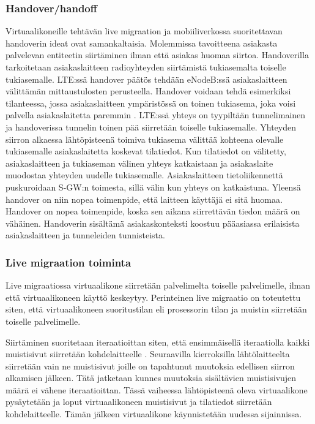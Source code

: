 \subsubsection*{Handover/handoff}%
Virtuaalikoneille tehtävän live migraation ja mobiiliverkossa suoritettavan handoverin ideat ovat samankaltaisia. Molemmissa tavoitteena asiakasta palvelevan entiteetin siirtäminen ilman että asiakas huomaa siirtoa.
Handoverilla tarkoitetaan asiakaslaitteen radioyhteyden siirtämistä tukiasemalta toiselle tukiasemalle. 
LTE:ssä handover päätös tehdään eNodeB:ssä asiakaslaitteen välittämän mittaustulosten perusteella. 
Handover voidaan tehdä esimerkiksi tilanteessa, jossa asiakaslaitteen ympäristössä on toinen tukiasema, joka voisi palvella asiakaslaitetta paremmin \cite[s.~96]{etsilte}.
LTE:ssä yhteys on tyypiltään tunnelimainen ja handoverissa tunnelin toinen pää siirretään toiselle tukiasemalle.
Yhteyden siirron alkaessa lähtöpisteenä toimiva tukiasema välittää kohteena olevalle tukiasemalle asiakaslaitetta koskevat tilatiedot. Kun tilatiedot on välitetty, asiakaslaitteen ja tukiaseman välinen yhteys katkaistaan ja asiakaslaite muodostaa yhteyden uudelle tukiasemalle.
Asiakaslaitteen tietoliikennettä puskuroidaan S-GW:n toimesta, sillä välin kun yhteys on katkaistuna. Yleensä handover on niin nopea toimenpide, että laitteen käyttäjä ei sitä huomaa.
Handover on nopea toimenpide, koska sen aikana siirrettävän tiedon määrä on vähäinen.
Handoverin sisältämä asiakaskonteksti koostuu pääasiassa erilaisista asiakaslaitteen ja tunneleiden tunnisteista.

\subsubsection*{Live migraation toiminta}%
Live migraatiossa virtuaalikone siirretään palvelimelta toiselle palvelimelle, ilman että virtuaalikoneen käyttö keskeytyy. 
Perinteinen live migraatio on toteutettu siten, että virtuaalikoneen suoritustilan eli prosessorin tilan ja muistin siirretään toiselle palvelimelle.

Siirtäminen suoritetaan iteraatioittan siten, että ensimmäisellä iteraatiolla kaikki muistisivut siirretään kohdelaitteelle \cite{clark2005live}.
Seuraavilla kierroksilla lähtölaitteelta siirretään vain ne muistisivut joille on tapahtunut muutoksia edellisen siirron alkamisen jälkeen. 
Tätä jatketaan kunnes muutoksia sisältävien muistisivujen määrä ei vähene iteraatioittan.
Tässä vaiheessa lähtöpisteenä oleva virtuaalikone pysäytetään ja loput virtuaalikoneen muistisivut ja tilatiedot siirretään kohdelaitteelle. Tämän jälkeen virtuaalikone käynnistetään uudessa sijainnissa. 

